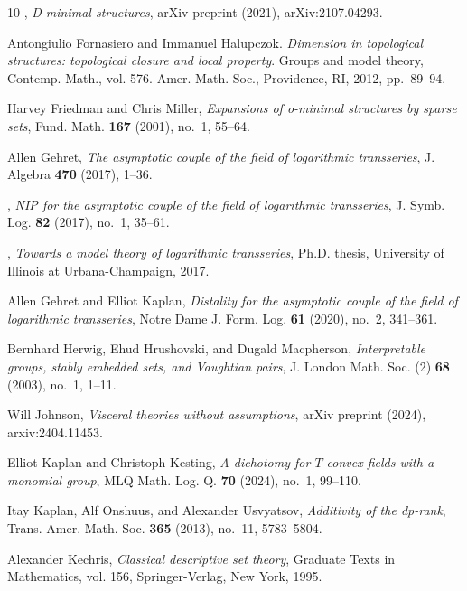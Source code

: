 \documentclass[11pt]{amsart}
\theoremstyle{plain}
\theoremstyle{definition}
\numberwithin{equation}{section}
\newcommand\0{\varnothing}
\begin{document}
\begin{thebibliography}{10}
\bysame, \emph{D-minimal structures}, arXiv preprint (2021), arXiv:2107.04293.

Antongiulio Fornasiero and Immanuel Halupczok. \emph{Dimension in topological structures: topological
closure and local property}. Groups and model theory, Contemp. Math., vol. 576. Amer. Math. Soc., Providence, RI, 2012, pp.~89--94.

Harvey Friedman and Chris Miller, \emph{Expansions of o-minimal structures by
  sparse sets}, Fund. Math. \textbf{167} (2001), no.~1, 55--64.

Allen Gehret, \emph{The asymptotic couple of the field of logarithmic
  transseries}, J. Algebra \textbf{470} (2017), 1--36.

\bysame, \emph{N{IP} for the asymptotic couple of the field of logarithmic
  transseries}, J. Symb. Log. \textbf{82} (2017), no.~1, 35--61.

\bysame, \emph{Towards a model theory of logarithmic transseries}, Ph.D.
  thesis, University of Illinois at Urbana-Champaign, 2017.

Allen Gehret and Elliot Kaplan, \emph{Distality for the asymptotic couple of
  the field of logarithmic transseries}, Notre Dame J. Form. Log. \textbf{61}
  (2020), no.~2, 341--361.

Bernhard Herwig, Ehud Hrushovski, and Dugald Macpherson, \emph{Interpretable
  groups, stably embedded sets, and {V}aughtian pairs}, J. London Math. Soc.
  (2) \textbf{68} (2003), no.~1, 1--11.

Will Johnson, \emph{Visceral theories without assumptions}, arXiv preprint
  (2024), arxiv:2404.11453.

Elliot Kaplan and Christoph Kesting, \emph{A dichotomy for ${T}$-convex fields
  with a monomial group}, MLQ Math. Log. Q. \textbf{70} (2024), no.~1, 99--110.

Itay Kaplan, Alf Onshuus, and Alexander Usvyatsov, \emph{Additivity of the
  dp-rank}, Trans. Amer. Math. Soc. \textbf{365} (2013), no.~11, 5783--5804.

Alexander Kechris, \emph{Classical descriptive set theory}, Graduate Texts in
  Mathematics, vol. 156, Springer-Verlag, New York, 1995.


\end{thebibliography}
\end{document}
